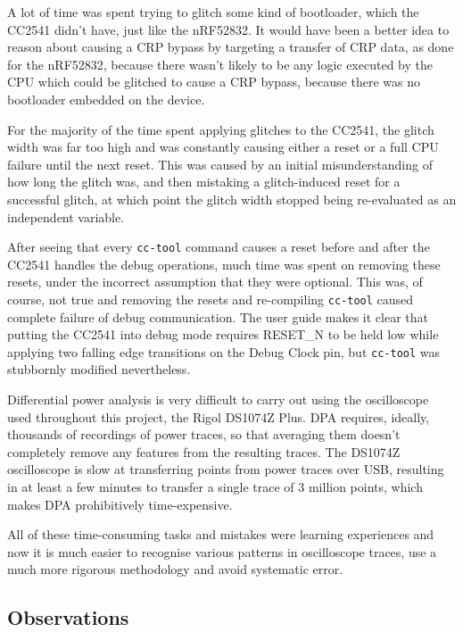 A lot of time was spent trying to glitch some kind of bootloader, which
the CC2541 didn't have, just like the nRF52832. It would have been a
better idea to reason about causing a CRP bypass by targeting a transfer
of CRP data, as done for the nRF52832, because there wasn't likely to be
any logic executed by the CPU which could be glitched to cause a CRP
bypass, because there was no bootloader embedded on the device.

For the majority of the time spent applying glitches to the CC2541, the
glitch width was far too high and was constantly causing either a reset
or a full CPU failure until the next reset. This was caused by an
initial misunderstanding of how long the glitch was, and then mistaking
a glitch-induced reset for a successful glitch, at which point the
glitch width stopped being re-evaluated as an independent variable.

After seeing that every \texttt{cc-tool} command causes a reset before
and after the CC2541 handles the debug operations, much time was spent
on removing these resets, under the incorrect assumption that they were
optional. This was, of course, not true and removing the resets and
re-compiling \texttt{cc-tool} caused complete failure of debug
communication. The user guide makes it clear that putting the CC2541
into debug mode requires RESET\_N to be held low while applying two
falling edge transitions on the Debug Clock pin, but \texttt{cc-tool}
was stubbornly modified nevertheless.

Differential power analysis is very difficult to carry out using the
oscilloscope used throughout this project, the Rigol DS1074Z Plus. DPA
requires, ideally, thousands of recordings of power traces, so that
averaging them doesn't completely remove any features from the resulting
traces. The DS1074Z oscilloscope is slow at transferring points from
power traces over USB, resulting in at least a few minutes to transfer a
single trace of 3 million points, which makes DPA prohibitively
time-expensive.

All of these time-consuming tasks and mistakes were learning experiences
and now it is much easier to recognise various patterns in oscilloscope
traces, use a much more rigorous methodology and avoid systematic error.

\hypertarget{observations-1}{%
\subsection{\texorpdfstring{Observations\label{section_cc2541_observations}}{Observations}}\label{observations-1}}

